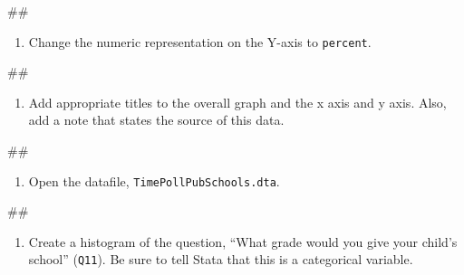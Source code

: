 \documentclass[
]{book}
\newenvironment{Shaded}{\begin{snugshade}}{\end{snugshade}}
\newcommand{\NormalTok}[1]{#1}
\providecommand{\tightlist}{%
  \setlength{\itemsep}{0pt}\setlength{\parskip}{0pt}}
\begin{document}
\begin{Shaded}
\begin{Highlighting}[]
\NormalTok{\#\#}
\end{Highlighting}
\end{Shaded}

\begin{enumerate}
\def\labelenumi{\arabic{enumi}.}
\setcounter{enumi}{3}
\tightlist
\item
  Change the numeric representation on the Y-axis to \texttt{percent}.
\end{enumerate}

\begin{Shaded}
\begin{Highlighting}[]
\NormalTok{\#\#}
\end{Highlighting}
\end{Shaded}

\begin{enumerate}
\def\labelenumi{\arabic{enumi}.}
\setcounter{enumi}{4}
\tightlist
\item
  Add appropriate titles to the overall graph and the x axis and y axis. Also, add a note that states the source of this data.
\end{enumerate}

\begin{Shaded}
\begin{Highlighting}[]
\NormalTok{\#\#}
\end{Highlighting}
\end{Shaded}

\begin{enumerate}
\def\labelenumi{\arabic{enumi}.}
\setcounter{enumi}{5}
\tightlist
\item
  Open the datafile, \texttt{TimePollPubSchools.dta}.
\end{enumerate}

\begin{Shaded}
\begin{Highlighting}[]
\NormalTok{\#\#}
\end{Highlighting}
\end{Shaded}

\begin{enumerate}
\def\labelenumi{\arabic{enumi}.}
\setcounter{enumi}{6}
\tightlist
\item
  Create a histogram of the question, ``What grade would you give your child's school'' (\texttt{Q11}). Be sure to tell Stata that this is a categorical variable.
\end{enumerate}
\end{document}
